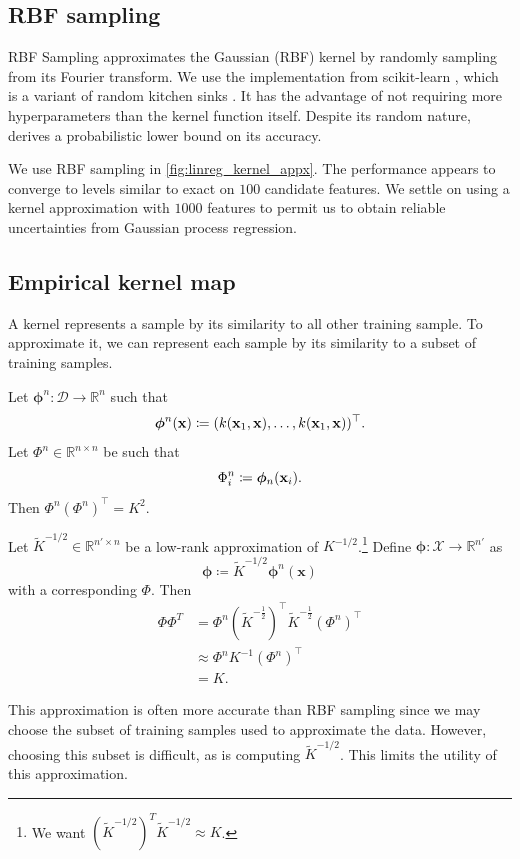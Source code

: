 \documentclass[11pt,twoside,openright]{report}
\newcommand\bphi{\bm{\phi}}
\newcommand\bbR{\mathbb{R}}
\newcommand\bx{\mathbf{x}}
\newcommand\cD{\mathcal{D}}
\newcommand\cX{\mathcal{X}}
\begin{document}
\subsection{RBF sampling}

RBF Sampling approximates the Gaussian (RBF) kernel by randomly sampling from its Fourier transform. We use the implementation from scikit-learn \citep{Sklearn}, which is a variant of random kitchen sinks \citep{KitchenSinks}. It has the advantage of not requiring more hyperparameters than the kernel function itself. Despite its random nature, \citep{KitchenSinks} derives a probabilistic lower bound on its accuracy.

We use RBF sampling in \cref{fig:linreg_kernel_appx}. The performance appears to converge to levels similar to exact on $100$ candidate features. We settle on using a kernel approximation with $1000$ features to permit us to obtain reliable uncertainties from Gaussian process regression.

\subsection{Empirical kernel map}

A kernel represents a sample by its similarity to all other training sample. To approximate it, we can represent each sample by its similarity to a subset of training samples.\citep{Kernels}

Let $\bphi^n : \cD \to \bbR^n$ such that \[
  \bphi^n(\bx) \coloneqq (k(\bx_1, \bx), \dots, k(\bx_1, \bx))^\top \text.
\] Let $\Phi^n \in \bbR^{n\times n}$ be such that \[
  \Phi^n_i \coloneqq \bphi_n(\bx_i) \text.
\] Then $\Phi^n(\Phi^n)^\top = K^2$.

Let $\tilde K^{-1/2} \in \bbR^{n' \times n}$ be a low-rank approximation of $K^{-1/2}$.\footnote{We want $(\tilde K^{-1/2})^T\tilde K^{-1/2} \approx K$.} Define $\bphi : \cX \to \bbR^{n'}$ as \[
    \bphi \coloneqq \tilde K^{-1/2} \bphi^n(\bx)
\] with a corresponding $\Phi$. Then \begin{align*}
    \Phi\Phi^T &= \Phi^n\left(\tilde K^{-\frac12}\right)^\top \tilde K^{-\frac12}\left(\Phi^n\right)^\top \\
    &\approx \Phi^nK^{-1}\left(\Phi^n\right)^\top \\
    &= K \text{.}
\end{align*}

This approximation is often more accurate than RBF sampling since we may choose the subset of training samples used to approximate the data. However, choosing this subset is difficult, as is computing $\tilde K^{-1/2}$. This limits the utility of this approximation.
\end{document}
